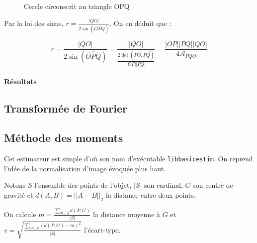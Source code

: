 \documentclass{article}
\begin{document}
	  \begin{figure}[!h]
	    \centering
	    \caption{Cercle circonscrit au triangle OPQ}
	    \label{cercle-circonscrit}
	  \end{figure}
	  
	  Par la loi des sinus, $r = \frac{|QO|}{2 \sin\left(\widehat{OPQ}\right)}$. On en déduit que :
	  
	  \[ r = \frac{|QO|}{2 \sin\left(\widehat{OPQ}\right)} = \frac{|QO|}{\frac{2 \det\left(\overrightarrow{PO}, \overrightarrow{PQ} \right)}{|OP| |PQ|}} = \frac{|OP| |PQ| |QO|}{4 \mathcal{A}_{PQO}}  \]
	
	\paragraph{Résultats}
    
    \subsection{Transformée de Fourier}  %
    
    \subsection{Méthode des moments} %
      Cet estimateur est simple d'où son nom d'exécutable \verb-libbasicestim-. On reprend l'idée de la normalisation d'image évoquée plus haut.
      
      Notons $S$ l'ensemble des points de l'objet, $|S|$ son cardinal, $G$ son centre de gravité et $d(A,B)=||A-B||_2$ la distance entre deux points.
      
      On calcule $m=\frac{\sum_{P\in S}d(P,G)}{|S|}$ la distance moyenne à $G$ et $v=\sqrt{\frac{\sum_{P\in S}\left ( d(P,G) -m\right ) ^2}{|S|}}$ l'écart-type.
      
\end{document}
